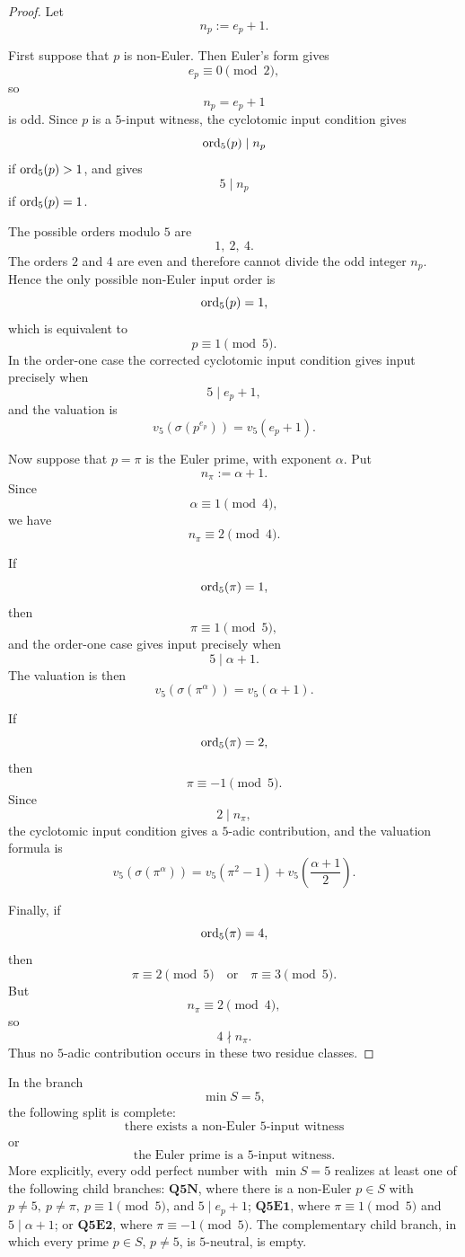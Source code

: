 \begin{proof}
Let
\[
  n_p:=e_p+1.
\]

First suppose that $p$ is non-Euler.  Then Euler's form gives
\[
  e_p\equiv0\pmod2,
\]
so
\[
  n_p=e_p+1
\]
is odd.  Since $p$ is a $5$-input witness, the cyclotomic input condition gives
\[
  \operatorname{ord}_5(p)\mid n_p
\]
if $\operatorname{ord}_5(p)>1$, and gives
\[
  5\mid n_p
\]
if $\operatorname{ord}_5(p)=1$.

The possible orders modulo $5$ are
\[
  1,\ 2,\ 4.
\]
The orders $2$ and $4$ are even and therefore cannot divide the odd integer
$n_p$.  Hence the only possible non-Euler input order is
\[
  \operatorname{ord}_5(p)=1,
\]
which is equivalent to
\[
  p\equiv1\pmod5.
\]
In the order-one case the corrected cyclotomic input condition gives input
precisely when
\[
  5\mid e_p+1,
\]
and the valuation is
\[
  v_5(\sigma(p^{e_p}))=v_5(e_p+1).
\]

Now suppose that $p=\pi$ is the Euler prime, with exponent $\alpha$.  Put
\[
  n_\pi:=\alpha+1.
\]
Since
\[
  \alpha\equiv1\pmod4,
\]
we have
\[
  n_\pi\equiv2\pmod4.
\]

If
\[
  \operatorname{ord}_5(\pi)=1,
\]
then
\[
  \pi\equiv1\pmod5,
\]
and the order-one case gives input precisely when
\[
  5\mid \alpha+1.
\]
The valuation is then
\[
  v_5(\sigma(\pi^\alpha))=v_5(\alpha+1).
\]

If
\[
  \operatorname{ord}_5(\pi)=2,
\]
then
\[
  \pi\equiv-1\pmod5.
\]
Since
\[
  2\mid n_\pi,
\]
the cyclotomic input condition gives a $5$-adic contribution, and the valuation
formula is
\[
  v_5(\sigma(\pi^\alpha))
  =
  v_5(\pi^2-1)
  +
  v_5\!\left(\frac{\alpha+1}{2}\right).
\]

Finally, if
\[
  \operatorname{ord}_5(\pi)=4,
\]
then
\[
  \pi\equiv2\pmod5
  \quad\text{or}\quad
  \pi\equiv3\pmod5.
\]
But
\[
  n_\pi\equiv2\pmod4,
\]
so
\[
  4\nmid n_\pi.
\]
Thus no $5$-adic contribution occurs in these two residue classes.
\end{proof}

\begin{corollary}
\label{cor:q5-first-input-coverage-split}
In the branch
\[
  \min S=5,
\]
the following split is complete:
\[
  \text{there exists a non-Euler $5$-input witness}
\]
or
\[
  \text{the Euler prime is a $5$-input witness}.
\]
More explicitly, every odd perfect number with \(\min S=5\) realizes at least
one of the following child branches: \(\mathbf{Q5N}\), where there is a
non-Euler \(p\in S\) with \(p\ne5,\ p\ne\pi,\ p\equiv1\pmod5\), and
\(5\mid e_p+1\); \(\mathbf{Q5E1}\), where \(\pi\equiv1\pmod5\) and
\(5\mid\alpha+1\); or \(\mathbf{Q5E2}\), where \(\pi\equiv-1\pmod5\).  The
complementary child branch, in which every prime \(p\in S\), \(p\ne5\), is
\(5\)-neutral, is empty.
\end{corollary}

